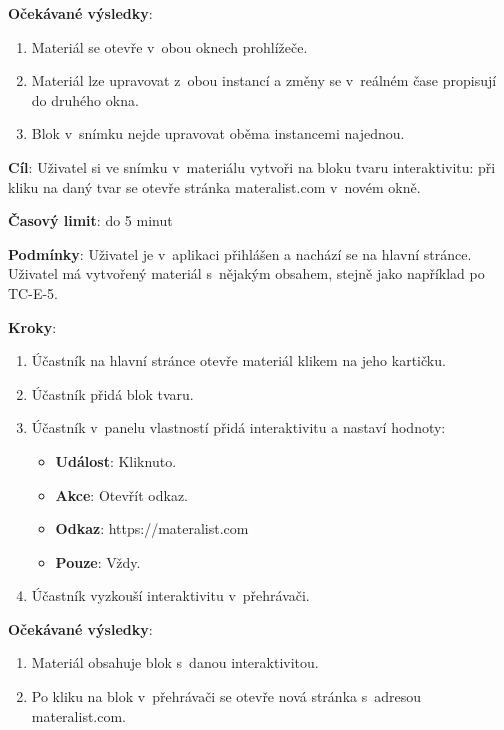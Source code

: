 \textbf{Očekávané výsledky}:

\begin{enumerate}[leftmargin=1.4cm]
    \item Materiál se otevře v~obou oknech prohlížeče.
    \item Materiál lze upravovat z~obou instancí a změny se v~reálném čase propisují do druhého okna.
    \item Blok v~snímku nejde upravovat oběma instancemi najednou.
\end{enumerate}





\vspace{1em}

\textbf{Cíl}: Uživatel si ve snímku v~materiálu vytvoři na bloku tvaru interaktivitu: při kliku na daný tvar se otevře stránka materalist.com v~novém okně.

\textbf{Časový limit}: do 5 minut

\textbf{Podmínky}:  Uživatel je v~aplikaci přihlášen a nachází se na hlavní stránce.  Uživatel má vytvořený materiál s~nějakým obsahem, stejně jako například po TC-E-5.

\textbf{Kroky}:

\begin{enumerate}[leftmargin=1.4cm]
    \item Účastník na hlavní stránce otevře materiál klikem na jeho kartičku.
    \item Účastník přidá blok tvaru.
    \item Účastník v~panelu vlastností přidá interaktivitu a nastaví hodnoty:
    \begin{itemize}
        \item \textbf{Událost}: Kliknuto.
        \item \textbf{Akce}: Otevřít odkaz.
        \item \textbf{Odkaz}: https://materalist.com
        \item \textbf{Pouze}: Vždy.
    \end{itemize}
    \item Účastník vyzkouší interaktivitu v~přehrávači.
\end{enumerate}

\textbf{Očekávané výsledky}:

\begin{enumerate}[leftmargin=1.4cm]
    \item Materiál obsahuje blok s~danou interaktivitou.
    \item Po kliku na blok v~přehrávači se otevře nová stránka s~adresou materalist.com.
\end{enumerate}




